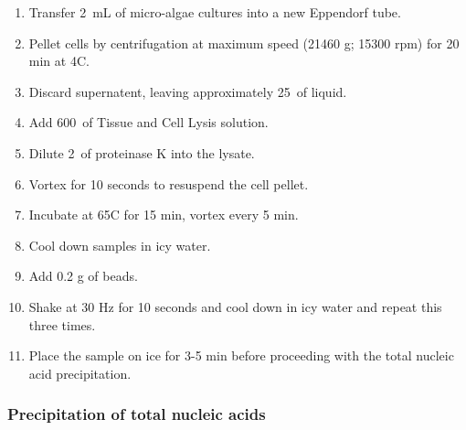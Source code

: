 \begin{enumerate}
\item Transfer 2~mL of micro-algae cultures into a new Eppendorf tube.
\item Pellet cells by centrifugation at maximum speed (21460 g; 15300 rpm) for 20 min at 4\degree C.
\item Discard supernatent, leaving approximately 25~\uL of liquid.
\item Add 600~\uL of Tissue and Cell Lysis solution.
\item Dilute 2~\uL of proteinase K into the lysate.
\item Vortex for 10 seconds to resuspend the cell pellet.
\item Incubate at 65\degree C for 15 min, vortex every 5 min.
\item Cool down samples in icy water.
\item Add 0.2 g of beads.
\item Shake at 30 Hz for 10 seconds and cool down in icy water and repeat this three times. 
\item Place the sample on ice for 3-5 min before proceeding with the total nucleic acid precipitation.
\end{enumerate}

\subsubsection{Precipitation of total nucleic acids}


